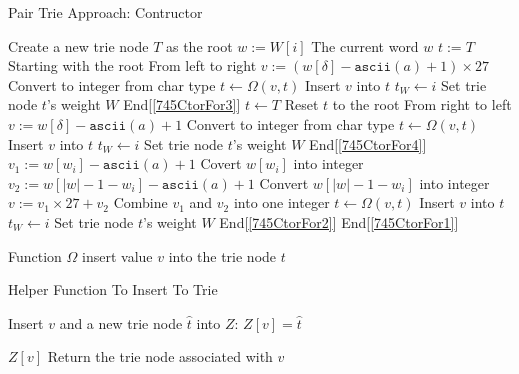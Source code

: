 \begin{algorithm}[H]
\caption{Pair Trie Approach: Contructor}
\begin{algorithmic}[1]
\State Create a new trie node $T$ as the root
 \label{745CtorFor1}
\State $w:=W[i]$ \Comment The current word $w$
 \label{745CtorFor2}
\State $t:=T$ \Comment Starting with the root 
 \Comment From left to right \label{745CtorFor3}
\State $ v:= (w[\delta] - \texttt{ascii}(a) + 1)\times 27$ \Comment Convert to integer from char type \label{745algonote1}
\State $t\gets \Omega(v, t)$ \Comment Insert $v$ into $t$
\State $t_W \gets i$ \Comment Set trie node $t$'s weight $W$
\EndFor \Comment End[\ref{745CtorFor3}]
\State $t\gets T$ \Comment Reset $t$ to the root
 \Comment From right to left \label{745CtorFor4}
\State $ v:= w[\delta] - \texttt{ascii}(a) + 1$ \Comment Convert to integer from char type
\State $t\gets \Omega(v, t)$ \Comment Insert $v$ into $t$
\State $t_W \gets i$ \Comment Set trie node $t$'s weight $W$
\EndFor \Comment End[\ref{745CtorFor4}]
\State $v_1:= w[w_i] - \texttt{ascii}(a) + 1$ \Comment Covert $w[w_i]$ into integer
\State $v_2:= w[|w| - 1 - w_i] - \texttt{ascii}(a) + 1$ \Comment Convert $w[|w| - 1 - w_i]$ into integer
\State $v:=v_1\times 27+v_2$ \Comment Combine $v_1$ and $v_2$ into one integer \label{745algonote2}
\State $t\gets \Omega(v,t)$ \Comment Insert $v$  into $t$
\State $t_W \gets i$ \Comment Set trie node $t$'s weight $W$
\EndFor \Comment End[\ref{745CtorFor2}]
\EndFor \Comment End[\ref{745CtorFor1}]
\EndProcedure
\end{algorithmic}
\end{algorithm}

Function $\Omega$ insert value $v$ into the trie node $t$
\begin{algorithm}[H]
\caption{Helper Function To Insert To Trie}
\label{745insert}
\begin{algorithmic}[1]
\State Insert $v$ and a new trie node $\hat{t}$ into $Z$: $Z[v]=\hat{t}$
\EndIf
{}
\end{algorithmic}
\end{algorithm}
\begin{algorithm}[H]
\begin{algorithmic}[1]
\State \Return $Z[v]$ \Comment Return the trie node associated with $v$
\EndFunction
\end{algorithmic}
\end{algorithm}

